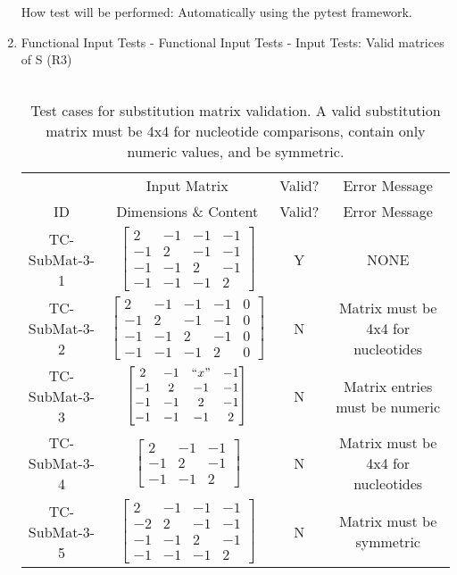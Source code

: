 \documentclass[12pt, titlepage]{article}
\begin{document}
\begin{enumerate}
How test will be performed: Automatically using the pytest framework.

\newpage

\item{Functional Input Tests - Functional Input Tests - Input Tests: Valid matrices of S (R3)\\\\}

\begin{table}[h]
  \centering
  \begin{tabular}{|c|c|c c|}
  \hline 
    & Input Matrix & Valid? & Error Message \\
  \cline{2-4}
  ID & Dimensions \& Content & Valid? & Error Message \\
  \hline
  TC-SubMat-3-1 & 
  $\begin{bmatrix} 
      2 & -1 & -1 & -1 \\ 
     -1 &  2 & -1 & -1 \\ 
     -1 & -1 &  2 & -1 \\ 
     -1 & -1 & -1 &  2 
  \end{bmatrix}$ & Y & NONE \\
  \hline
  TC-SubMat-3-2 & 
  $\begin{bmatrix} 
      2 & -1 & -1 & -1 & 0 \\ 
     -1 &  2 & -1 & -1 & 0 \\ 
     -1 & -1 &  2 & -1 & 0 \\ 
     -1 & -1 & -1 &  2 & 0 
  \end{bmatrix}$ & N & Matrix must be 4x4 for nucleotides \\
  \hline
  TC-SubMat-3-3 & 
  $\begin{bmatrix} 
      2 & -1 & ``x" & -1 \\ 
     -1 &  2 & -1 & -1 \\ 
     -1 & -1 &  2 & -1 \\ 
     -1 & -1 & -1 &  2 
  \end{bmatrix}$ & N & Matrix entries must be numeric \\
  \hline
  TC-SubMat-3-4 & 
  $\begin{bmatrix} 
      2 & -1 & -1 \\ 
     -1 &  2 & -1 \\ 
     -1 & -1 &  2  
  \end{bmatrix}$ & N & Matrix must be 4x4 for nucleotides \\
  \hline
  TC-SubMat-3-5 & 
  $\begin{bmatrix} 
      2 & -1 & -1 & -1 \\ 
     -2 &  2 & -1 & -1 \\ 
     -1 & -1 &  2 & -1 \\ 
     -1 & -1 & -1 &  2 
  \end{bmatrix}$ & N & Matrix must be symmetric \\
  \hline
  \end{tabular}
  \caption{Test cases for substitution matrix validation. A valid substitution matrix must be 4x4 for nucleotide comparisons, 
  contain only numeric values, and be symmetric.}
  \label{tab:test-case-3}
\end{table}



\end{enumerate}
\end{document}

